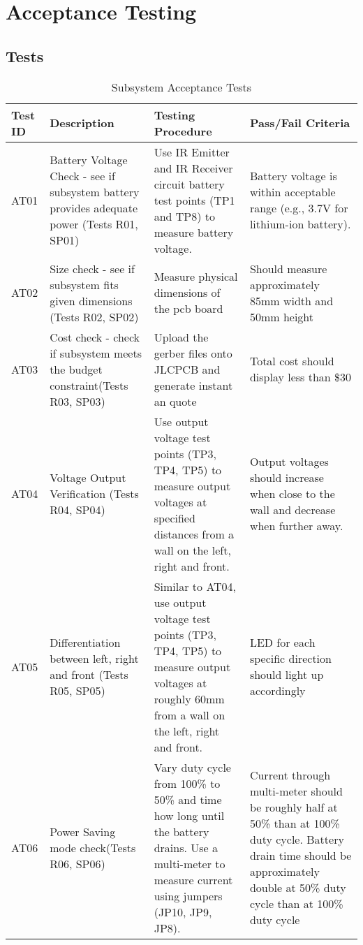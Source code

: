 \documentclass[class=report,11pt,crop=false]{standalone}
\begin{document}
\chapter{Acceptance Testing} \label{ch:atp}
\vspace{-1cm}

\section{Tests}
\begin{table}[h]
  \centering
    \caption{Subsystem Acceptance Tests}
    \label{tab:tests}
    \begin{tabular}{ >{\centering\arraybackslash}m{1cm}  m{4cm} m{5cm} m{5cm}}
      \hline
      \textbf{Test ID} & \textbf{Description} & \textbf{Testing Procedure}& \textbf{Pass/Fail Criteria} \\   
      \hline
      AT01 & Battery Voltage Check - see if subsystem battery provides adequate power (Tests R01, SP01)  & Use IR Emitter and IR Receiver circuit battery test points (TP1 and TP8) to measure battery voltage. & Battery voltage is within acceptable range (e.g., 3.7V for lithium-ion battery). \\
       \hline
      AT02 & Size check - see if subsystem fits given dimensions (Tests R02, SP02) & Measure physical dimensions of the pcb board & Should measure approximately 85mm width and 50mm height \\
       \hline
      AT03 & Cost check - check if subsystem meets the budget constraint(Tests R03, SP03)  & Upload the gerber files onto JLCPCB and generate instant an quote & Total cost should display less than \$30 \\
      \hline
      AT04 & Voltage Output Verification (Tests R04, SP04)  & Use output voltage test points (TP3, TP4, TP5) to measure output voltages at specified distances from a wall on the left, right and front. & Output voltages should increase when close to the wall and decrease when further away. \\
      \hline
      AT05 & Differentiation between left, right and front (Tests R05, SP05) & Similar to AT04, use output voltage test points (TP3, TP4, TP5) to measure output voltages at roughly 60mm from a wall on the left, right and front. & LED for each specific direction should light up accordingly \\
      \hline
      AT06 & Power Saving mode check(Tests R06, SP06)  & Vary duty cycle from 100\% to 50\% and time how long until the battery drains. Use a multi-meter to measure current using jumpers (JP10, JP9, JP8). &  Current through multi-meter should be roughly half at 50\% than at 100\% duty cycle. Battery drain time should be approximately double at 50\% duty cycle than at 100\% duty cycle  \\
      \hline
    \end{tabular}
\end{table}
\end{document}
